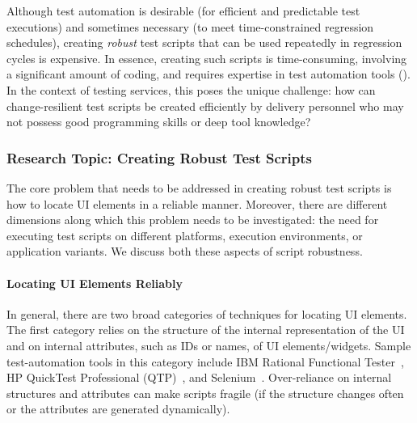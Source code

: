 Although test automation is desirable (\eg for efficient and predictable test
executions) and sometimes necessary (\eg to meet time-constrained regression
schedules), creating \textit{robust} test scripts that can be used repeatedly in
regression cycles is expensive. In essence, creating such scripts is
time-consuming, involving a significant amount of coding, and requires expertise
in test automation tools (\eg \cite{hpqtp,ibmrft,selenium}). In the context of
testing services, this poses the unique challenge: how can change-resilient test
scripts be created efficiently by delivery personnel who may not possess good
programming skills or deep tool knowledge? 


\vskip -5pt
\subsubsection*{Research Topic: Creating Robust Test Scripts}

The core problem that needs to be addressed in creating robust test scripts is
how to locate UI elements in a reliable manner. Moreover, there are different
dimensions along which this problem needs to be investigated: the need for
executing test scripts on different platforms, execution environments, or
application variants. We discuss both these aspects of script robustness.

\vskip -5pt
\paragraph*{Locating UI Elements Reliably} In general, there are two broad categories of
techniques for locating UI elements. The first category relies on the structure
of the internal representation of the UI
and on internal attributes, such as IDs or names, of UI elements/widgets. Sample
test-automation tools in this category include IBM Rational Functional
Tester~\cite{ibmrft}, HP QuickTest Professional (QTP)~\cite{hpqtp}, and
Selenium~\cite{selenium}. Over-reliance on internal structures and attributes
can make scripts fragile (\eg if the structure changes often or the attributes
are generated dynamically).

